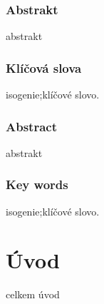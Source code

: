 \documentclass [12pt]{report}
\begin{document}
\newpage
\thispagestyle{empty}
\subsection*{Abstrakt}
abstrakt


\subsection*{Klíčová slova}
isogenie;klíčové slovo.


\vspace*{4cm}

\subsection*{Abstract}
abstrakt

\subsection*{Key words}
isogenie;klíčové slovo.





{
\hypersetup{linkcolor=black}
\tableofcontents
}
\thispagestyle{empty}

\chapter*{Úvod}

celkem úvod
\end{document}
